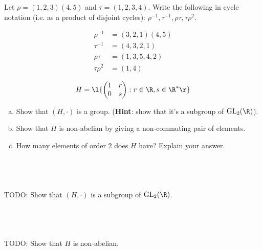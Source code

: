 \documentclass[a4paper]{article}
\begin{document}


\begin{questionbody}
Let $\rho = (1, 2, 3) (4, 5)$ and $\tau = (1, 2, 3, 4)$. Write the following in cycle notation (i.e. as a product of disjoint cycles): $\rho^{-1}, \tau^{-1}, \rho \tau, \tau \rho^2$.
\end{questionbody}

\begin{align*}
\rho^{-1} &= (3, 2, 1) (4, 5) \\
\tau^{-1} &= (4, 3, 2, 1) \\
\rho \tau &= (1, 3, 5, 4, 2) \\
\tau \rho^2 &= (1, 4)
\end{align*}


\renewcommand{\thesubsection}{Q\arabic{section}~(\alph{subsection})}

\begin{questionbody}
\[ H = \l\{ \begin{pmatrix} 1 & r \\ 0 & s \end{pmatrix} \colon r \in \R, s \in \R^* \r\} \]
\begin{enumerate}[(a)]
\item Show that $(H, \cdot)$ is a group. (\textbf{Hint}: show that it's a subgroup of $\mathrm{GL}_2(\R)$).
\item Show that $H$ is non-abelian by giving a non-commuting pair of elements.
\item How many elements of order 2 does $H$ have? Explain your answer.
\end{enumerate}
\end{questionbody}

\subsection{~} %

TODO: Show that $(H, \cdot)$ is a subgroup of $\mathrm{GL}_2(\R)$.

\subsection{~} %

TODO: Show that $H$ is non-abelian.
\end{document}
